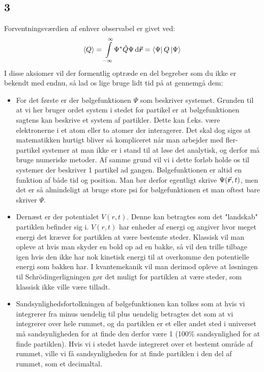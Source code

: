 \documentclass[../Kvantemekanik.tex]{subfiles}
\begin{document}
\subsection*{3}
Forventningsværdien af enhver observabel er givet ved:
\begin{equation}
\expect Q=\integral{\Psi^{*}\op Q\Psi}{\v r}{-\infty}{\infty} = \matrixel{\Psi}{Q}{\Psi}
\label{kvant:eq:forvent}
\end{equation}
I disse aksiomer vil der formentlig optræde en del begreber som du ikke er bekendt med endnu, så lad os lige bruge lidt tid på at gennemgå dem:
\begin{itemize}

\item For det første er der bølgefunktionen $\Psi$ som beskriver systemet. Grunden til at vi her bruger ordet system i stedet for partikel er at bølgefunktionen sagtens kan beskrive et system af partikler. Dette kan f.eks. være elektronerne i et atom eller to atomer der interagerer. Det skal dog siges at matematikken hurtigt bliver så kompliceret når man arbejder med fler-partikel systemer at man ikke er i stand til at løse det analytisk, og derfor må bruge numeriske metoder. Af samme grund vil vi i dette forløb holde os til systemer der beskriver 1 partikel ad gangen. Bølgefunktionen er altid en funktion af både tid og position. Man bør derfor egentligt skrive $\Psi({\vec{\boldsymbol{r}}},t)$, men det er så almindeligt at bruge store psi for bølgefunktionen et man oftest bare skriver $\Psi$.

\item Dernæst er der potentialet $V(r,t)$. Denne kan betragtes som det "landskab" partiklen befinder sig i. $V(r,t)$ har enheder af energi og angiver hvor meget energi det kræver for partiklen at være bestemte steder. Klassisk vil man opleve at hvis man skyder en bold op ad en bakke, så vil den trille tilbage igen hvis den ikke har nok kinetisk energi til at overkomme den potentielle energi som bakken har. I kvantemekanik vil man derimod opleve at løsningen til Schrödingerligningen gør det muligt for partiklen at være steder, som klassisk ikke ville være tilladt.

\item Sandsynlighedsfortolkningen af bølgefunktionen kan tolkes som at hvis vi integrerer fra minus uendelig til plus uendelig betragtes det som at vi integrerer over hele rummet, og da partiklen er et eller andet sted i universet må sandsynligheden for at finde den derfor være 1 (100\%  sandsynlighed for at finde partiklen). Hvis vi i stedet havde integreret over et bestemt område af rummet, ville vi få sandsynligheden for at finde partiklen i den del af rummet, som et decimaltal.


\end{itemize}
\end{document}
